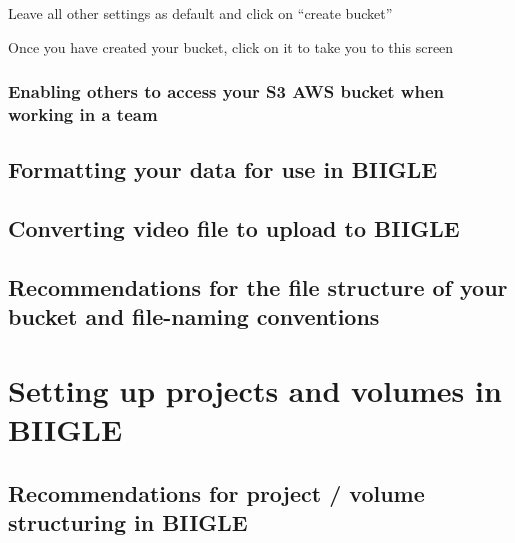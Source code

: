\documentclass[
  letterpaper,
  DIV=11,
  numbers=noendperiod]{scrartcl}
\begin{document}
Leave all other settings as default and click on ``create bucket''

Once you have created your bucket, click on it to take you to this
screen

\hypertarget{enabling-others-to-access-your-s3-aws-bucket-when-working-in-a-team}{%
\subsubsection{Enabling others to access your S3 AWS bucket when working
in a
team}\label{enabling-others-to-access-your-s3-aws-bucket-when-working-in-a-team}}

\hypertarget{formatting-your-data-for-use-in-biigle}{%
\subsection{Formatting your data for use in
BIIGLE}\label{formatting-your-data-for-use-in-biigle}}

\hypertarget{converting-video-file-to-upload-to-biigle}{%
\subsection{Converting video file to upload to
BIIGLE}\label{converting-video-file-to-upload-to-biigle}}

\hypertarget{recommendations-for-the-file-structure-of-your-bucket-and-file-naming-conventions}{%
\subsection{Recommendations for the file structure of your bucket and
file-naming
conventions}\label{recommendations-for-the-file-structure-of-your-bucket-and-file-naming-conventions}}

\hypertarget{setting-up-projects-and-volumes-in-biigle}{%
\section{Setting up projects and volumes in
BIIGLE}\label{setting-up-projects-and-volumes-in-biigle}}

\hypertarget{recommendations-for-project-volume-structuring-in-biigle}{%
\subsection{Recommendations for project / volume structuring in
BIIGLE}\label{recommendations-for-project-volume-structuring-in-biigle}}
\end{document}
